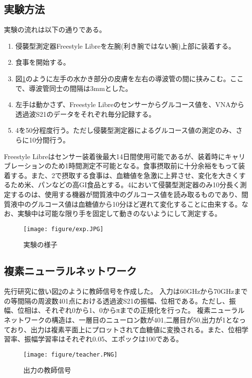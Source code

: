 \documentclass[11pt,a4paper,uplatex,draft]{ujarticle}
\begin{document}
\subsection{実験方法}
実験の流れは以下の通りである。
\begin{enumerate}
  \item 侵襲型測定器Freestyle Libreを左腕(利き腕ではない腕)上部に装着する。
  \item 食事を開始する。
  \item 図\ref{fig:exp}のように左手の水かき部分の皮膚を左右の導波管の間に挟みこむ。ここで、導波管同士の間隔は3mmとした。
  \item 左手は動かさず、Freestyle Libreのセンサーからグルコース値を、VNAから透過波S21のデータをそれぞれ毎分記録する。
  \item 4を50分程度行う。ただし侵襲型測定器によるグルコース値の測定のみ、さらに10分間行う。
\end{enumerate}
Freestyle Libreはセンサー装着後最大14日間使用可能であるが、装着時にキャリブレーションのため1時間測定不可能となる。食事摂取前に十分余裕をもって装着する。また、2で摂取する食事は、血糖値を急激に上昇させ、変化を大きくするため米、パンなどの高GI食品とする。4において侵襲型測定器のみ10分長く測定するのは、使用する機器が間質液中のグルコース値を読み取るものであり、間質液中のグルコース値は血糖値から10分ほど遅れて変化することに由来する。なお、実験中は可能な限り手を固定して動きのないようにして測定する。


\begin{figure}[hbtp]
	\centering
	\texttt{[image: figure/exp.JPG]}
	\caption{実験の様子}
	\label{fig:exp}
\end{figure}


\subsection{複素ニューラルネットワーク}
先行研究\cite{Husan}に倣い図\ref{fig:teacher_out}のように教師信号を作成した。
入力は60GHzから70GHzまでの等間隔の周波数401点における透過波S21の振幅、位相である。ただし、振幅、位相は、それぞれ0から1、0からπまでの正規化を行った。
複素ニューラルネットワークの構造は、一層目のニューロン数が401,二層目が50,出力が1となっており、出力は複素平面上にプロットされて血糖値に変換される。また、位相学習率、振幅学習率はそれぞれ0.05、エポックは100である。

\begin{figure}[hbtp]
	\centering
	\texttt{[image: figure/teacher.PNG]}
	\caption{出力の教師信号}
	\label{fig:teacher_out}
\end{figure}
\end{document}
